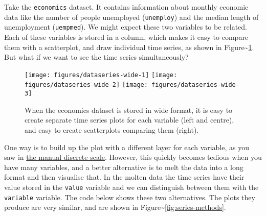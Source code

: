 
Take the \texttt{economics} dataset. It contains information about
monthly economic data like the number of people unemployed
(\texttt{unemploy}) and the median length of unemployment
(\texttt{uempmed}). We might expect these two variables to be related.
Each of these variables is stored in a column, which makes it easy to
compare them with a scatterplot, and draw individual time series, as
shown in Figure\textasciitilde{}\ref{fig:series-wide}. But what if we
want to see the time series simultaneously?
 

\begin{Shaded}
\begin{Highlighting}[]
  \NormalTok{)}
  \NormalTok{)}
 \StringTok{ }\NormalTok{()}
\end{Highlighting}
\end{Shaded}

\begin{figure}

{\centering \texttt{[image: figures/dataseries-wide-1]} \texttt{[image: figures/dataseries-wide-2]} \texttt{[image: figures/dataseries-wide-3]} 

}

\caption{When the economics dataset is stored in wide format, it is easy to create separate time series plots for each variable (left and centre), and easy to create scatterplots comparing them (right).\label{fig:series-wide}}
\end{figure}

One way is to build up the plot with a different layer for each
variable, as you saw in \hyperref[sub:scale-manual]{the manual discrete
scale}. However, this quickly becomes tedious when you have many
variables, and a better alternative is to melt the data into a long
format and then visualise that. In the molten data the time series have
their value stored in the \texttt{value} variable and we can distinguish
between them with the \texttt{variable} variable. The code below shows
these two alternatives. The plots they produce are very similar, and are
shown in Figure\textasciitilde{}\ref{fig:series-methods}.

